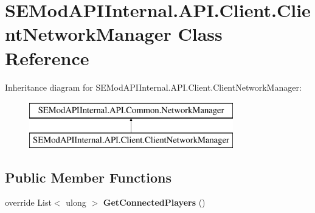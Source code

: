 \hypertarget{class_s_e_mod_a_p_i_internal_1_1_a_p_i_1_1_client_1_1_client_network_manager}{}\section{S\+E\+Mod\+A\+P\+I\+Internal.\+A\+P\+I.\+Client.\+Client\+Network\+Manager Class Reference}
\label{class_s_e_mod_a_p_i_internal_1_1_a_p_i_1_1_client_1_1_client_network_manager}
Inheritance diagram for S\+E\+Mod\+A\+P\+I\+Internal.\+A\+P\+I.\+Client.\+Client\+Network\+Manager\+:\begin{figure}[H]
\begin{center}
\leavevmode
\includegraphics[height=2.000000cm]{class_s_e_mod_a_p_i_internal_1_1_a_p_i_1_1_client_1_1_client_network_manager}
\end{center}
\end{figure}
\subsection*{Public Member Functions}
\begin{DoxyCompactItemize}
\item 
\hypertarget{class_s_e_mod_a_p_i_internal_1_1_a_p_i_1_1_client_1_1_client_network_manager_a582f5ea8db885243822feec3fea8f714}{}override List$<$ ulong $>$ {\bfseries Get\+Connected\+Players} ()\label{class_s_e_mod_a_p_i_internal_1_1_a_p_i_1_1_client_1_1_client_network_manager_a582f5ea8db885243822feec3fea8f714}

\end{DoxyCompactItemize}

